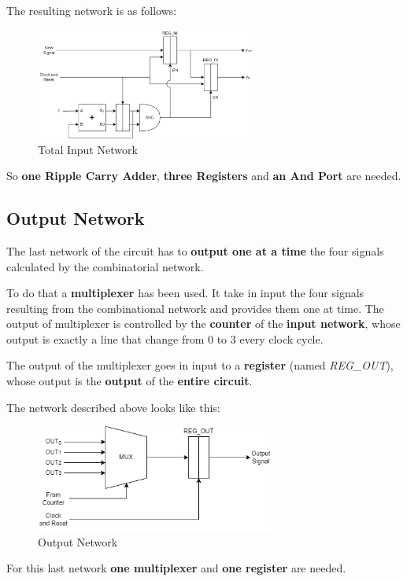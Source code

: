 The resulting network is as follows:

\begin{figure}[H]
    \centering
    \includegraphics[width=0.65\textwidth]{img/Chapter2/InputNetwork2.png}
    \caption{Total Input Network}
    \label{fig:InputNetwork2}
\end{figure}

So \textbf{one Ripple Carry Adder}, \textbf{three Registers} and \textbf{an And Port} are needed.

\subsection{Output Network}

The last network of the circuit has to \textbf{output one at a time} the four signals calculated by the combinatorial network. 

To do that a \textbf{multiplexer} has been used. It take in input the four signals resulting from the combinational network and provides them one at time. The output of multiplexer is controlled by the \textbf{counter} of the \textbf{input network}, whose output is exactly a line that change from 0 to 3 every clock cycle.

The output of the multiplexer goes in input to a \textbf{register} (named \textit{REG\_OUT}), whose output is the \textbf{output} of the \textbf{entire circuit}.

The network described above looks like this:

\begin{figure}[H]
    \centering
    \includegraphics[width=0.7\textwidth]{img/Chapter2/OutputNetwork.png}
    \caption{Output Network}
    \label{fig:OutputNetwork}
\end{figure}

For this last network \textbf{one multiplexer} and \textbf{one register} are needed.